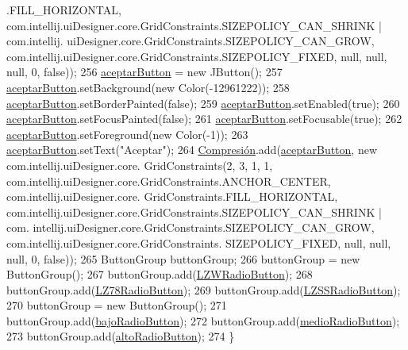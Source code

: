 \begin{DoxyCode}
      .FILL\_HORIZONTAL, com.intellij.uiDesigner.core.GridConstraints.SIZEPOLICY\_CAN\_SHRINK | com.intellij.
      uiDesigner.core.GridConstraints.SIZEPOLICY\_CAN\_GROW, com.intellij.uiDesigner.core.GridConstraints.SIZEPOLICY\_FIXED, 
      null, null, null, 0, \textcolor{keyword}{false}));
256         \hyperlink{classpresentacion_1_1form_1_1PopUp__Comp_a6321172d7f93f607a1cea6e2eee6a6ea}{aceptarButton} = \textcolor{keyword}{new} JButton();
257         \hyperlink{classpresentacion_1_1form_1_1PopUp__Comp_a6321172d7f93f607a1cea6e2eee6a6ea}{aceptarButton}.setBackground(\textcolor{keyword}{new} Color(-12961222));
258         \hyperlink{classpresentacion_1_1form_1_1PopUp__Comp_a6321172d7f93f607a1cea6e2eee6a6ea}{aceptarButton}.setBorderPainted(\textcolor{keyword}{false});
259         \hyperlink{classpresentacion_1_1form_1_1PopUp__Comp_a6321172d7f93f607a1cea6e2eee6a6ea}{aceptarButton}.setEnabled(\textcolor{keyword}{true});
260         \hyperlink{classpresentacion_1_1form_1_1PopUp__Comp_a6321172d7f93f607a1cea6e2eee6a6ea}{aceptarButton}.setFocusPainted(\textcolor{keyword}{false});
261         \hyperlink{classpresentacion_1_1form_1_1PopUp__Comp_a6321172d7f93f607a1cea6e2eee6a6ea}{aceptarButton}.setFocusable(\textcolor{keyword}{true});
262         \hyperlink{classpresentacion_1_1form_1_1PopUp__Comp_a6321172d7f93f607a1cea6e2eee6a6ea}{aceptarButton}.setForeground(\textcolor{keyword}{new} Color(-1));
263         \hyperlink{classpresentacion_1_1form_1_1PopUp__Comp_a6321172d7f93f607a1cea6e2eee6a6ea}{aceptarButton}.setText(\textcolor{stringliteral}{"Aceptar"});
264         \hyperlink{classpresentacion_1_1form_1_1PopUp__Comp_a5769b499f21466bae765c41428512966}{Compresión}.add(\hyperlink{classpresentacion_1_1form_1_1PopUp__Comp_a6321172d7f93f607a1cea6e2eee6a6ea}{aceptarButton}, \textcolor{keyword}{new} com.intellij.uiDesigner.core.
      GridConstraints(2, 3, 1, 1, com.intellij.uiDesigner.core.GridConstraints.ANCHOR\_CENTER, com.intellij.uiDesigner.core.
      GridConstraints.FILL\_HORIZONTAL, com.intellij.uiDesigner.core.GridConstraints.SIZEPOLICY\_CAN\_SHRINK | com.
      intellij.uiDesigner.core.GridConstraints.SIZEPOLICY\_CAN\_GROW, com.intellij.uiDesigner.core.GridConstraints.
      SIZEPOLICY\_FIXED, null, null, null, 0, \textcolor{keyword}{false}));
265         ButtonGroup buttonGroup;
266         buttonGroup = \textcolor{keyword}{new} ButtonGroup();
267         buttonGroup.add(\hyperlink{classpresentacion_1_1form_1_1PopUp__Comp_a810fe251f9c88e3b83ce466feafafe2e}{LZWRadioButton});
268         buttonGroup.add(\hyperlink{classpresentacion_1_1form_1_1PopUp__Comp_ac750ecbde516e2fee470693124d2ff63}{LZ78RadioButton});
269         buttonGroup.add(\hyperlink{classpresentacion_1_1form_1_1PopUp__Comp_ad18c1029f04cc43d033183dca943977c}{LZSSRadioButton});
270         buttonGroup = \textcolor{keyword}{new} ButtonGroup();
271         buttonGroup.add(\hyperlink{classpresentacion_1_1form_1_1PopUp__Comp_add9532658d448dcbfa9b7dd40ddc8b38}{bajoRadioButton});
272         buttonGroup.add(\hyperlink{classpresentacion_1_1form_1_1PopUp__Comp_ad1daa09264648f37642b24a698e32206}{medioRadioButton});
273         buttonGroup.add(\hyperlink{classpresentacion_1_1form_1_1PopUp__Comp_a9f49f4c6ce6d4f60a7015d8699aef151}{altoRadioButton});
274     \}
\end{DoxyCode}
